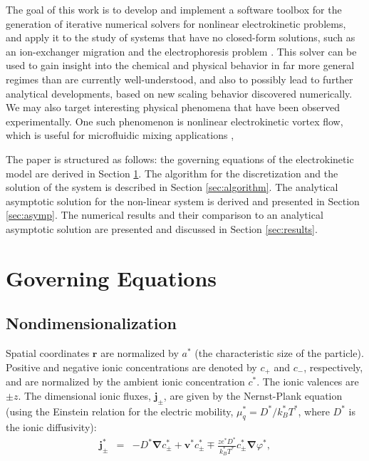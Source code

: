 \documentclass[10pt]{ijnam}
\newcommand\bnabla{\boldsymbol{\nabla}}
\newcommand\bv{\boldsymbol{v}}
\newcommand\bj{\boldsymbol{j}}
\newcommand\br{\boldsymbol{r}}
\begin{document}
The goal of this work is to develop and implement a software toolbox for the generation
of iterative numerical solvers for nonlinear electrokinetic problems, and apply it to the study
of systems that have no closed-form solutions, such as an ion-exchanger migration
\cite{yariv2010migration} and the electrophoresis problem \cite{schnitzer2012surface}.
This solver can be used to gain insight into the chemical and physical behavior 
in far more general regimes than are currently well-understood, 
and also to possibly lead to further analytical developments, based on new scaling behavior
discovered numerically. We may also target interesting physical
phenomena that have been observed experimentally.
One such phenomenon is nonlinear electrokinetic vortex flow, 
which is useful for microfluidic mixing applications \cite{wang2004mix, ben2002vortex},

The paper is structured as follows: the governing equations of the electrokinetic model
are derived in Section \ref{sec:equations}. The algorithm for the discretization and 
the solution of the system is described in Section \ref{sec:algorithm}.
The analytical asymptotic solution for the non-linear system is derived 
and presented in Section \ref{sec:asymp}.
The numerical results and their comparison to an analytical asymptotic solution 
are presented and discussed in Section \ref{sec:results}. 

\section{Governing Equations} \label{sec:equations}

\subsection{Nondimensionalization}
Spatial coordinates $\br$ are normalized by $a^*$ 
(the characteristic size of the particle).
Positive and negative ionic concentrations are denoted by $c_+$ and $c_-$, respectively, and
are normalized by the ambient ionic concentration $c^*$. The ionic valences are $\pm z$.
The dimensional ionic fluxes, $\bj_\pm$, are given by the Nernst-Plank equation 
(using the Einstein relation for the electric mobility, $\mu_q^* = D^* / k_B^* T^*$, 
where $D^*$ is the ionic diffusivity):
\begin{eqnarray}
\bj^*_\pm &=& 
-D^* \bnabla c^*_\pm + \bv^* c^*_\pm \mp \frac{z e^* D^*}{k_B^* T^*} c^*_\pm \bnabla \varphi^*,
\end{eqnarray}
\end{document}
